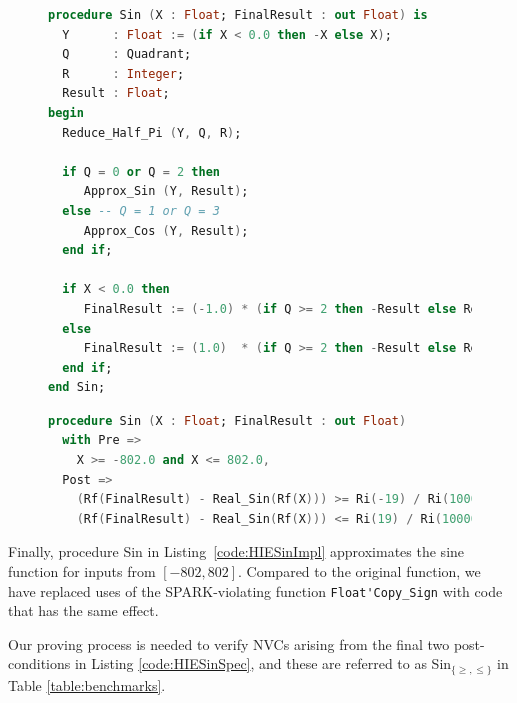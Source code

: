 \documentclass[runningheads]{llncs}
\begin{document}
\begin{figure}[t]
\vspace{-2ex}
\begin{lstlisting}[caption=Sin Implementation, language=ada, label={code:HIESinImpl},basicstyle=\fontsize{7.5}{9pt}\tt]
procedure Sin (X : Float; FinalResult : out Float) is
  Y      : Float := (if X < 0.0 then -X else X);
  Q      : Quadrant;
  R      : Integer;
  Result : Float;
begin
  Reduce_Half_Pi (Y, Q, R);
  
  if Q = 0 or Q = 2 then
     Approx_Sin (Y, Result);
  else -- Q = 1 or Q = 3
     Approx_Cos (Y, Result);
  end if;
  
  if X < 0.0 then
     FinalResult := (-1.0) * (if Q >= 2 then -Result else Result);
  else
     FinalResult := (1.0)  * (if Q >= 2 then -Result else Result);
  end if;
end Sin;  

\end{lstlisting}
  
\begin{lstlisting}[caption=Sin Specification, language=ada, label={code:HIESinSpec},basicstyle=\fontsize{7.5}{9pt}\tt]
procedure Sin (X : Float; FinalResult : out Float)
  with Pre => 
    X >= -802.0 and X <= 802.0,
  Post =>
    (Rf(FinalResult) - Real_Sin(Rf(X))) >= Ri(-19) / Ri(100000) and
    (Rf(FinalResult) - Real_Sin(Rf(X))) <= Ri(19) / Ri(100000);
\end{lstlisting}
\vspace{-2ex}
\end{figure}

Finally, procedure Sin in Listing~\ref{code:HIESinImpl} approximates the sine function for inputs from $[-802,802]$.
Compared to the original function, 
we have replaced uses of the SPARK-violating function \lstinline{Float'Copy_Sign} with code that has the same effect.

Our proving process is needed to verify NVCs arising from the final two post-conditions in Listing \ref{code:HIESinSpec}, and these are referred to as Sin${}_{\{\ge,\le\}}$ in Table \ref{table:benchmarks}.
\end{document}
